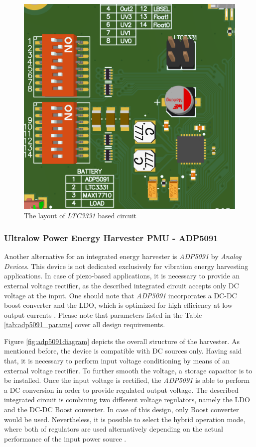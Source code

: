 \documentclass[12pt,a4paper]{article}
\begin{document}
\begin{figure}[ht!]
\includegraphics[scale=0.7]{ltc3331_layout.png}
\caption{The layout of \textit{LTC3331} based circuit}
\label{fig:ltc3331layout}
\end{figure}
\par

\subsubsection{Ultralow Power Energy Harvester PMU - ADP5091}

Another alternative for an integrated energy harvester is \textit{ADP5091} by \textit{Analog Devices}. This device is not dedicated exclusively for vibration energy harvesting applications. In case of piezo-based applications, it is necessary to provide an external voltage rectifier, as the described integrated circuit accepts only DC voltage at the input. One should note that \textit{ADP5091} incorporates a DC-DC boost converter and the LDO, which is optimized for high efficiency at low output currents \cite{adp5091_params}. Please note that parameters listed in the Table \ref{tab:adp5091_params} cover all design requirements.
\par

Figure \ref{fig:adp5091diagram} depicts the overall structure of the harvester. As mentioned before, the device is compatible with DC sources only. Having said that, it is necessary to perform input voltage conditioning by means of an external voltage rectifier. To further smooth the voltage, a storage capacitor is to be installed. Once the input voltage is rectified, the \textit{ADP5091} is able to perform a DC conversion in order to provide regulated output voltage. The described integrated circuit is combining two different voltage regulators, namely the LDO and the DC-DC Boost converter. In case of this design, only Boost converter would be used. Nevertheless, it is possible to select the hybrid operation mode, where both of regulators are used alternatively depending on the actual performance of the input power source  \cite{adp5091_params}.
\end{document}
